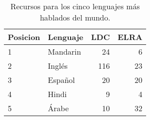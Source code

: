 \begin{table}[H]
\centering
\caption{Recursos para los cinco lenguajes más hablados del mundo.}
\label{tab:resources_by_langauge}
\begin{tabular}{|l|l|r|r|} %
\hline
\textbf{Posicion} & \textbf{Lenguaje} & \textbf{LDC} & \textbf{ELRA} \\ \hline
1    & Mandarin & 24  & 6    \\ \hline
2    & Inglés  & 116 & 23   \\ \hline
3    & Español  & 20  & 20   \\ \hline
4    & Hindi    & 9   & 4    \\ \hline
5    & Árabe   & 10  & 32   \\ \hline
\end{tabular}
\end{table}